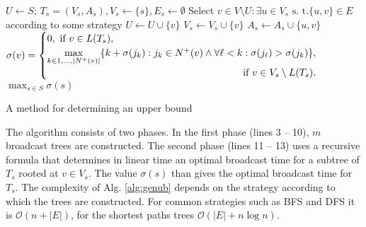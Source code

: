 \begin{algorithm}[]
$U\leftarrow S$;
$T_s=(V_s,A_s), V_s\leftarrow \{s\}, E_s\leftarrow\emptyset$\;
 {
	 {
		Select $v\in V\setminus U:\exists u\in V_s \text{ s. t.} \{u,v\}\in E$ according to some strategy\; 	
		$U\leftarrow U\cup\{v\}$\;
		$V_s\leftarrow V_s\cup\{v\}$\;
		$A_s\leftarrow A_s\cup\{u,v\}$\;
	}
}
 {
$	
\sigma(v)=\begin{cases}
		0, \text{ if } v\in L(T_s),\\
		\max\limits_{k\in 1,\dots,|N^+(v)|}\{k+\sigma(j_k):j_k\in N^+(v)\wedge \forall \ell<k:\sigma(j_\ell)>\sigma(j_k)\},\\
		\hfill \text{ if }v\in V_s\setminus L(T_s).

\end{cases}\;
$
}
\Return $\max_{s\in S}\sigma(s)$\;
 \caption{A method for determining an upper bound}
\label{alg:genub}
\end{algorithm}
The algorithm consists of two phases. 
In the first phase (lines 3 -- 10), $m$ broadcast trees are constructed.
The second phase (lines 11 -- 13) uses a recursive formula that determines in linear time an optimal broadcast time for a subtree of $T_s$ rooted at $v\in V_s$.
The value  $\sigma(s)$ than gives the optimal broadcast time for $T_s$.
The complexity of Alg. \ref{alg:genub} depends on the strategy according to which the trees are constructed.
For common strategies such as BFS and DFS it is $\mathcal{O}(n+|E|)$, for the shortest paths trees $\mathcal{O}(|E| + n\log n)$.



